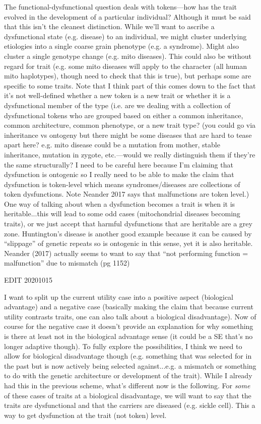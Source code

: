 \documentclass{article}
\begin{document}
The functional-dysfunctional question deals with tokens---how has the trait evolved in the development of a particular individual? Although it must be said that this isn't the cleanest distinction. While we'll want to ascribe a dysfunctional state (e.g. disease) to an individual, we might cluster underlying etiologies into a single coarse grain phenotype (e.g. a syndrome). Might also cluster a single genotype change (e.g. mito diseases). This could also be without regard for trait (e.g. some mito diseases will apply to the character (all human mito haplotypes), though need to check that this is true), but perhaps some are specific to some traits.
Note that I think part of this comes down to the fact that it's not well-defined whether a new token is a new trait or whether it is a dysfunctional member of the type (i.e. are we dealing with a collection of dysfunctional tokens who are grouped based on either a common inheritance, common architecture, common phenotype, or a new trait type? (you could go via inheritance vs ontogeny but there might be some diseases that are hard to tease apart here? e.g. mito disease could be a mutation from mother, stable inheritance, mutation in zygote, etc.---would we really distinguish them if they're the same structurally? I need to be careful here because I'm claiming that dysfunction is ontogenic so I really need to be able to make the claim that dysfunction is token-level which means syndromes/diseases are collections of token dysfunctions. Note Neander 2017 says that malfunctions are token level.)
One way of talking about when a dysfunction becomes a trait is when it is heritable...this will lead to some odd cases (mitochondrial diseases becoming traits), or we just accept that harmful dysfunctions that are heritable are a grey zone. Huntington's disease is another good example because it can be caused by ``slippage'' of genetic repeats so is ontogenic in this sense, yet it is also heritable.
Neander (2017) actually seems to want to say that ``not performing function = malfunction'' due to mismatch (pg 1152)

EDIT 20201015

I want to split up the current utility case into a positive aspect (biological advantage) and a negative case (basically making the claim that because current utility contrasts traits, one can also talk about a biological disadvantage). Now of course for the negative case it doesn't provide an explanation for why something is there at least not in the biological advantage sense (it could be a SE that's no longer adaptive though). To fully explore the possibilities, I think we need to allow for biological disadvantage though (e.g. something that was selected for in the past but is now actively being selected against...e.g. a mismatch or something to do with the genetic architecture or development of the trait). While I already had this in the previous scheme, what's different now is the following. For \emph{some} of these cases of traits at a biological disadvantage, we will want to say that the traits are dysfunctional and that the carriers are diseased (e.g. sickle cell). This a way to get dysfunction at the trait (not token) level.
\end{document}

